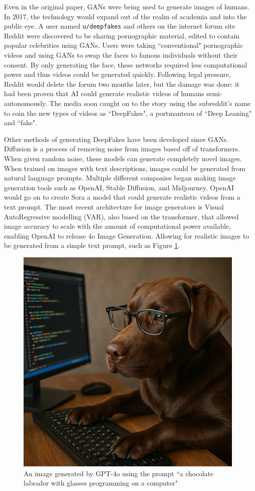 Even in the original paper, GANs were being used to generate images of humans\cite{goodfellow2014generative}. In 2017, the technology would expand out of the realm of academia and into the public eye. A user named \verb|u/deepfakes| and others on the internet forum site Reddit were discovered to be sharing pornographic material, edited to contain popular celebrities using GANs\cite{cole2018reddit}. Users were taking ``conventional" pornographic videos and using GANs to swap the faces to famous individuals without their consent. By only generating the face, these networks required less computational power and thus videos could be generated quickly. Following legal pressure, Reddit would delete the forum two months later\cite{cole2018reddit}, but the damage was done: it had been proven that AI could generate realistic videos of humans semi-autonomously. The media soon caught on to the story using the subreddit's name to coin the new types of videos as ``DeepFakes", a portmanteau of ``Deep Leaning" and ``fake".

Other methods of generating DeepFakes have been developed since GANs. Diffusion\cite{rombach2022high} is a process of removing noise from images based off of transformers\cite{vaswani2017attention}. When given random noise, these models can generate completely novel images. When trained on images with text descriptions, images could be generated from natural language prompts. Multiple different companies began making image generation tools such as OpenAI\cite{ramesh2022hierarchical}, Stable Diffusion\cite{stablediffusion2022}, and Midjourney\cite{midjourney2022}. OpenAI would go on to create Sora\cite{brooks2024video} a model that could generate realistic videos from a text prompt. The most recent architecture for image generators is Visual AutoRegressive modelling (VAR)\cite{tian2024visual}, also based on the transformer, that allowed image accuracy to scale with the amount of computational power available, enabling OpenAI to release 4o Image Generation\cite{4oimagegen}. Allowing for realistic images to be generated from a simple text prompt, such as Figure \ref{fig:gpt4o-dog}.

\begin{figure}[H]
    \centering
    \includegraphics[width=0.5\linewidth]{dissertation//figures/gpt4o.png}
    \caption{An image generated by GPT-4o\cite{4oimagegen} using the prompt ``a chocolate labrador with glasses programming on a computer"}
    \label{fig:gpt4o-dog}
\end{figure}

